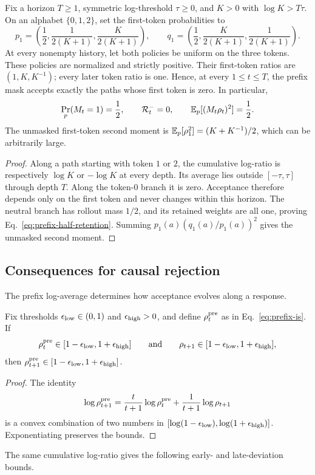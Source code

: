 \begin{example}
\label{ex:prefix-half-retention}
Fix a horizon $T\ge1$, symmetric log-threshold $\tau\ge0$, and
$K>0$ with $\log K>T\tau$. On an alphabet $\{0,1,2\}$, set the first-token
probabilities to
\[
 p_1=\left(\frac12,\frac{1}{2(K+1)},\frac{K}{2(K+1)}\right),\qquad
 q_1=\left(\frac12,\frac{K}{2(K+1)},\frac{1}{2(K+1)}\right).
\]
At every nonempty history, let both policies be uniform on the three tokens.
These policies are normalized and strictly positive. Their first-token
ratios are $(1,K,K^{-1})$; every later token ratio is one. Hence, at every
$1\le t\le T$, the prefix mask accepts exactly the paths whose first token
is zero. In particular,
\begin{equation}
 \Pr_p(M_t=1)=\frac12,\qquad
 \mathcal R_t^-=0,\qquad
 \mathbb{E}_p[(M_t\rho_t)^2]=\frac12.
 \label{eq:prefix-half-retention}
\end{equation}
The unmasked first-token second moment is
$\mathbb{E}_p[\rho_1^2]=(K+K^{-1})/2$, which can be arbitrarily large.
\end{example}
\begin{proof}
Along a path starting with token $1$ or $2$, the cumulative log-ratio is
respectively $\log K$ or $-\log K$ at every depth. Its average lies outside
$[-\tau,\tau]$ through depth $T$. Along the token-$0$ branch it is zero.
Acceptance therefore depends only on the first token and never changes
within this horizon. The neutral branch has rollout mass $1/2$, and its
retained weights are all one, proving Eq.~\eqref{eq:prefix-half-retention}.
Summing $p_1(a)(q_1(a)/p_1(a))^2$ gives the unmasked second moment.
\end{proof}

\subsection{Consequences for causal rejection}
The prefix log-average determines how acceptance evolves along a response.

\begin{lemma}
\label{lem:prefix-stability}
Fix thresholds $\epsilon_{\mathrm{low}}\in(0,1)$ and $\epsilon_{\mathrm{high}}>0$, and define $\rho_{t}^{\mathrm{pre}}$ as in Eq.~\eqref{eq:prefix-is}. If
\begin{equation*}
    \rho_{t}^{\mathrm{pre}}\in[1-\epsilon_{\mathrm{low}},1+\epsilon_{\mathrm{high}}]
    \qquad\text{and}\qquad
    \rho_{t+1}\in[1-\epsilon_{\mathrm{low}},1+\epsilon_{\mathrm{high}}],
\end{equation*}
then $\rho_{t+1}^{\mathrm{pre}}\in[1-\epsilon_{\mathrm{low}},1+\epsilon_{\mathrm{high}}]$.
\end{lemma}
\begin{proof}
The identity
\[
 \log\rho_{t+1}^{\mathrm{pre}}
 =\frac{t}{t+1}\log\rho_{t}^{\mathrm{pre}}+\frac{1}{t+1}\log \rho_{t+1}
\]
is a convex combination of two numbers in
$[\log(1-\epsilon_{\mathrm{low}}),\log(1+\epsilon_{\mathrm{high}})]$. Exponentiating preserves the bounds.
\end{proof}
The same cumulative log-ratio gives the following early- and late-deviation bounds.

